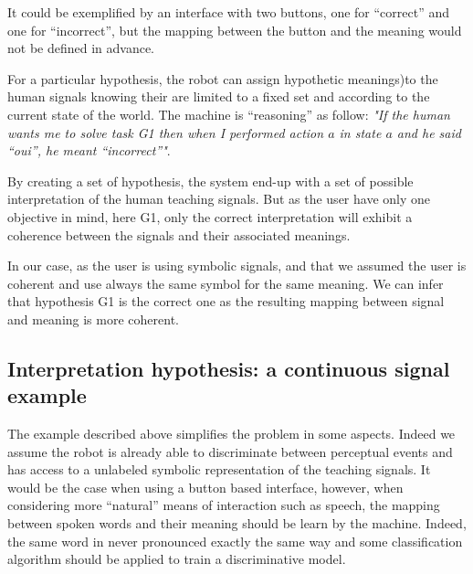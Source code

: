 It could be exemplified by an interface with two buttons, one for ``correct'' and one for ``incorrect'', but the mapping between the button and the meaning would not be defined in advance.




For a particular hypothesis, the robot can assign hypothetic meanings)to the human signals knowing their are limited to a fixed set and according to the current state of the world. The machine is ``reasoning'' as follow: \emph{"If the human wants me to solve task G1 then when I performed action $a$ in state $a$ and he said ``oui'', he meant ``incorrect''"}. 


By creating a set of hypothesis, the system end-up with a set of possible interpretation of the human teaching signals. But as the user have only one objective in mind, here G1, only the correct interpretation will exhibit a coherence between the signals and their associated meanings. 

In our case, as the user is using symbolic signals, and that we assumed the user is coherent and use always the same symbol for the same meaning. We can infer that hypothesis G1 is the correct one as the resulting mapping between signal and meaning is more coherent.


\subsection{Interpretation hypothesis: a continuous signal example}

The example described above simplifies the problem in some aspects. Indeed we assume the robot is already able to discriminate between perceptual events and has access to a unlabeled symbolic representation of the teaching signals. It would be the case when using a button based interface, however, when considering more ``natural'' means of interaction such as speech, the mapping between spoken words and their meaning should be learn by the machine. Indeed, the same word in never pronounced exactly the same way and some classification algorithm should be applied to train a discriminative model.

